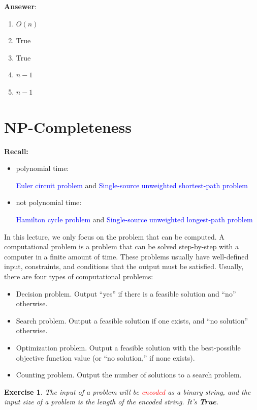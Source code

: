 \documentclass{article}
\newtheorem*{Exercise}{Exercise}
\begin{document}
\textbf{Ansewer}:
\begin{enumerate}
    \item $O(n)$
    \item True
    \item True
    \item $n-1$
    \item $n-1$
\end{enumerate}

\newpage
\section{NP-Completeness}
\textbf{Recall:}
\begin{itemize}
    \item polynomial time:\par
    \textcolor{blue}{Euler circuit problem} and \textcolor{blue}{Single-source unweighted shortest-path problem}
    \item not polynomial time: \par
    \textcolor{blue}{Hamilton cycle problem} and \textcolor{blue}{Single-source unweighted longest-path problem}
\end{itemize}\par

\hspace*{\fill}\par

In this lecture, we only focus on the problem that can be computed. A computational problem is a problem that can be solved step-by-step with a computer in a finite amount of time. These problems usually have well-defined input, constraints, and conditions that the output must be satisfied. Usually, there are four types of computational problems:
\begin{itemize}
    \item Decision problem. Output “yes” if there is a feasible solution and “no” otherwise.
    \item Search problem. Output a feasible solution if one exists, and “no solution” otherwise.
    \item Optimization problem. Output a feasible solution with the best-possible objective function value (or “no solution,” if none exists).
    \item Counting problem. Output the number of solutions to a search problem.
\end{itemize}

\begin{Exercise}
    The input of a problem will be \textcolor{red}{encoded} as a binary string, and the input size of a problem is the length of the encoded string. It's \textbf{True}.
\end{Exercise}\par
\end{document}
